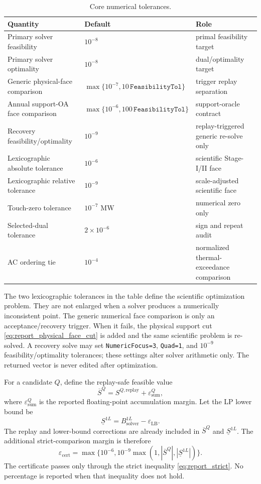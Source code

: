 \documentclass[10pt,journal,onecolumn]{IEEEtran}
\newcommand{\abs}[1]{\left|#1\right|}
\newcommand{\eps}{\varepsilon}
\begin{document}
\begin{table}[t]
\centering
\caption{Core numerical tolerances.}
\label{tab:core_tolerances}
\begin{tabular}{@{}lll@{}}
\toprule
Quantity & Default & Role \\
\midrule
Primary solver feasibility & $10^{-8}$ & primal feasibility target \\
Primary solver optimality & $10^{-8}$ & dual/optimality target \\
Generic physical-face comparison & $\max\{10^{-7},10\,\texttt{FeasibilityTol}\}$ & trigger replay separation \\
Annual support-OA face comparison & $\max\{10^{-6},100\,\texttt{FeasibilityTol}\}$ & support-oracle contract \\
Recovery feasibility/optimality & $10^{-9}$ & replay-triggered generic re-solve only \\
Lexicographic absolute tolerance & $10^{-6}$ & scientific Stage-I/II face \\
Lexicographic relative tolerance & $10^{-9}$ & scale-adjusted scientific face \\
Touch-zero tolerance & $10^{-7}$ MW & numerical zero only \\
Selected-dual tolerance & $2\times10^{-6}$ & sign and repeat audit \\
AC ordering tie & $10^{-4}$ & normalized thermal-exceedance comparison \\
\bottomrule
\end{tabular}
\end{table}

The two lexicographic tolerances in the table define the scientific optimization problem. They are not enlarged when a solver produces a numerically inconsistent point. The generic numerical face comparison is only an acceptance/recovery trigger. When it fails, the physical support cut \eqref{eq:report_physical_face_cut} is added and the same scientific problem is re-solved. A recovery solve may set \texttt{NumericFocus=3}, \texttt{Quad=1}, and $10^{-9}$ feasibility/optimality tolerances; these settings alter solver arithmetic only. The returned vector is never edited after optimization.

For a candidate $Q$, define the replay-safe feasible value
\begin{equation}
\overline S^Q
=S^{Q,\mathrm{replay}}
+\eps_{\mathrm{sum}}^Q,
\end{equation}
where $\eps_{\mathrm{sum}}^Q$ is the reported floating-point accumulation
margin. Let the LP lower bound be
\begin{equation}
\underline S^{1L}=B^{1L}_{\mathrm{solver}}-\eps_{\mathrm{LB}}.
\end{equation}
The replay and lower-bound corrections are already included in
$\overline S^Q$ and $\underline S^{1L}$. The additional strict-comparison
margin is therefore
\begin{equation}
\eps_{\mathrm{cert}}
=\max\{10^{-6},10^{-9}\max(1,\abs{\overline S^Q},\abs{\underline S^{1L}})\}.
\label{eq:report_eps_cert}
\end{equation}
The certificate passes only through the strict inequality
\eqref{eq:report_strict}. No percentage is reported when that inequality does
not hold.
\end{document}
